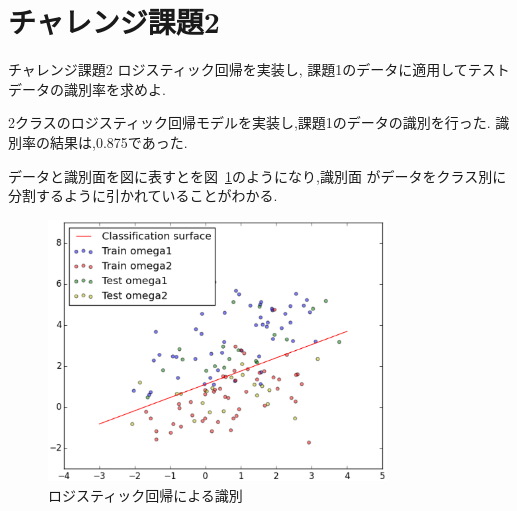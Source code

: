\section{チャレンジ課題2}\label{section:challenge2}
\begin{itembox}{チャレンジ課題2}
  ロジスティック回帰を実装し,
  課題1のデータに適用してテストデータの識別率を求めよ.
\end{itembox}

2クラスのロジスティック回帰モデルを実装し,課題1のデータの識別を行った.
識別率の結果は,0.875であった.

データと識別面を図に表すとを図~\ref{fig:challenge2}のようになり,識別面
がデータをクラス別に分割するように引かれていることがわかる.

\begin{figure}[htbp]
  \centering
  \includegraphics[width=0.8\textwidth]{./assets/challenge2_plot_20150212_000710.eps}
  \caption{ロジスティック回帰による識別}
  \label{fig:challenge2}
\end{figure}

